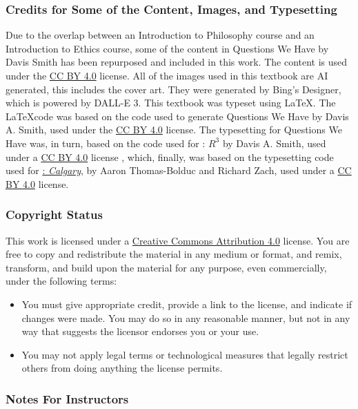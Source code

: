\subsubsection{Credits for Some of the Content, Images, and Typesetting}
Due to the overlap between an Introduction to Philosophy course and an Introduction to Ethics course, some of the content in Questions We Have by Davis Smith has been repurposed and included in this work. The content is used under the \href{https://creativecommons.org/licenses/by/4.0/}{CC BY 4.0} license. All of the images used in this textbook are AI generated, this includes the cover art. They were generated by Bing's Designer, which is powered by DALL-E 3. This textbook was typeset using \LaTeX. The \LaTeX code was based on the code used to generate Questions We Have by Davis A. Smith, used under the \href{https://creativecommons.org/licenses/by/4.0/}{CC BY 4.0} license. The typesetting for Questions We Have was, in turn, based on the code used for \forallx: \emph{$R^3$} by Davis A. Smith, used under a 
\href{https://creativecommons.org/licenses/by/4.0/}{CC BY 4.0} license , which, finally, was based on the typesetting code used for \href{https://forallx.openlogicproject.org/}{\forallx: \emph{Calgary}}, 
by Aaron Thomas-Bolduc and Richard Zach, used under a 
\href{https://creativecommons.org/licenses/by/4.0/}{CC BY 4.0} license.


\subsubsection{Copyright Status}

This work is licensed under a \href{https://creativecommons.org/licenses/by/4.0/}{Creative Commons Attribution 4.0} license.
You are free to copy and redistribute the material in any medium or format, and  remix, transform, and build upon the material for any purpose, even commercially, under the following terms:
\begin{itemize}
\item You must give appropriate credit, provide a link to the license, and indicate if changes were made. You may do so in any reasonable manner, but not in any way that suggests the licensor endorses you or your use.
\item You may not apply legal terms or technological measures that legally restrict others from doing anything the license permits.
\end{itemize}

\subsubsection{Notes For Instructors}

